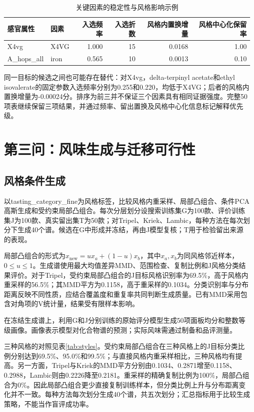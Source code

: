 \documentclass{mathorcup-journal}
\begin{document}
\begin{table}[t]
\centering\small
\caption{关键因素的稳定性与风格影响示例}\label{tab:factorcases}
\begin{tabular}{llrrrr}
\toprule
感官属性 & 因素 & 入选频率 & 入选折数 & 风格内置换增量 & 风格中心化保留率\\
\midrule
X4vg & X4VG & 1.000 & 15 & 0.0168 & 1.00\\
A\_hops\_all & iron & 0.565 & 10 & 0.0013 & 0.10\\
\bottomrule
\end{tabular}
\end{table}

同一目标的候选之间也可能存在替代：对X4vg，delta-terpinyl acetate和ethyl isovalerate的固定参数入选频率分别为0.255和0.220，均低于X4VG；后者的风格内置换增量为-0.00024分。排序为前三并不保证三个因素具有相同证据强度。完整50项表继续保留三项结果，并通过频率、留出置换及风格中心化信息标记解释优先级。



\section{第三问：风味生成与迁移可行性}

\subsection{风格条件生成}

以tasting\_category\_fine为风格标签，比较风格内重采样、局部凸组合、条件PCA高斯生成和受约束局部凸组合。每次分层划分设搜索训练集G为100款、评价训练集J为100款、真实留出集T为50款；对Tripel、Kriek、Lambic，每种方法在每次划分下生成40个谱。候选在G中形成并冻结，再由J模型复核；T用于检验留出来源的表现。


局部凸组合的形式为$x_{\mathrm{new}}=u x_a+(1-u)x_b$，其中$x_a,x_b$为同风格邻近样本，$0\le u\le1$。生成谱使用最大均值差异MMD、范围检查、复制比例和J风格分类结果评价\cite{ref12}。对于Tripel，受约束局部凸组合的J目标风格识别率为69.5\%，高于风格内重采样的56.5\%；其MMD平方为0.1158，高于重采样的0.1034。分类识别率与分布距离反映不同性质，应结合覆盖度和重复率共同判断生成质量。已有MMD采用包含对角项的V统计量，结果受有限样本影响。


在冻结生成谱上，利用G和J分别训练的原始评分模型生成50项面板均分和整数等级画像。画像表示模型对化合物谱的预测；实际风味需通过制备和品评测量。

三种风格的对照见表\ref{tab:styles}。受约束局部凸组合在三种风格上的J目标分类比例分别达到69.5\%、95.0\%和99.5\%；与直接风格内重采样相比，三种风格均有提高。另一方面，Tripel与Kriek的MMD平方分别由0.1034、0.2871增至0.1158、0.2988，Lambic则由0.2226降至0.2181。重采样的精确复制比例为100\%，局部凸组合为0\%。因此局部凸组合更少直接复制训练样本，但分类比例上升与分布距离变化并不一致。每种方法每次划分生成40个谱，共五次划分；汇总指标用于比较生成策略，不能当作盲评成功率。
\end{document}
